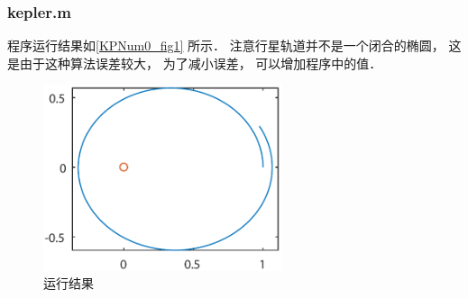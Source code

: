 \subsubsection{kepler.m}



程序运行结果如\autoref{KPNum0_fig1} 所示． 注意行星轨道并不是一个闭合的椭圆， 这是由于这种算法误差较大， 为了减小误差， 可以增加程序中的值．
\begin{figure}[ht]
\centering
\includegraphics[width=7cm]{./figures/KPNum0.pdf}
\caption{运行结果} \label{KPNum0_fig1}
\end{figure}
